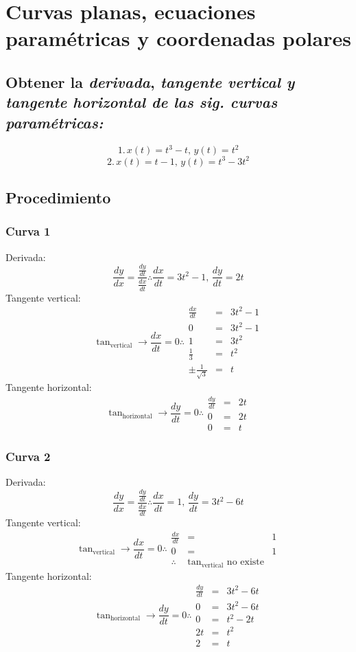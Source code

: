 \documentclass[letterpaper, 12pt]{article}
\begin{document}
\setcounter{page}{1}
\thispagestyle{fancy}
\section*{Curvas planas, ecuaciones paramétricas y coordenadas polares}
\subsection*{Obtener la \emph{derivada}, \emph{tangente vertical y tangente horizontal de las sig. curvas paramétricas:}}
\[1.\, x(t)=t^3-t, \, y(t)=t^2\]
\[2.\, x(t)=t-1, \, y(t)=t^3-3t^2\]
\subsection*{Procedimiento}
\subsubsection*{Curva 1}
\justify
Derivada: 
\[\frac{dy}{dx}=\frac{\frac{dy}{dt}}{\frac{dx}{dt}}\therefore \frac{dx}{dt}=3t^2-1,\, \frac{dy}{dt}=2t\]
Tangente vertical: 
\[\tan_{\text{vertical}}\rightarrow\frac{dx}{dt}=0 \therefore \begin{matrix}
    \frac{dx}{dt}&=&3t^2-1\\
    0&=&3t^2-1\\
    1&=&3t^2\\
    \frac{1}{3}&=&t^2\\
    \pm\frac{1}{\sqrt{3}}&=&t
\end{matrix}\]
Tangente horizontal:
\[\tan_{\text{horizontal}}\rightarrow\frac{dy}{dt}=0 \therefore \begin{matrix}
    \frac{dy}{dt}&=&2t\\
    0&=&2t\\
    0&=&t
\end{matrix}\]
\subsubsection*{Curva 2}
\justify
Derivada:
\[\frac{dy}{dx}=\frac{\frac{dy}{dt}}{\frac{dx}{dt}}\therefore \frac{dx}{dt}=1,\, \frac{dy}{dt}=3t^2-6t\]
Tangente vertical:
\[\tan_{\text{vertical}}\rightarrow\frac{dx}{dt}=0 \therefore \begin{matrix}
    \frac{dx}{dt}&=&1\\
    0&=&1\\
    \therefore &\tan_{\text{vertical}} \text{ no existe}
\end{matrix}\]
Tangente horizontal:
\[\tan_{\text{horizontal}}\rightarrow\frac{dy}{dt}=0 \therefore \begin{matrix}
    \frac{dy}{dt}&=&3t^2-6t\\
    0&=&3t^2-6t\\
    0&=&t^2-2t\\
    2t&=&t^2\\
    2&=&t
\end{matrix}\]
\end{document}
